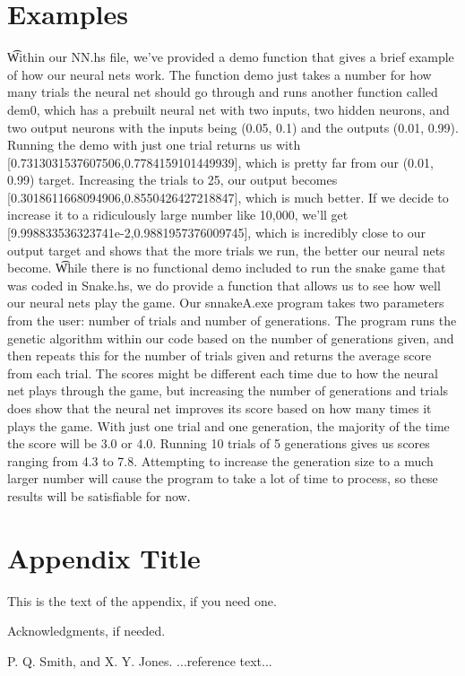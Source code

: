 \documentclass{sigplanconf}
\begin{document}
\section{Examples}
\t Within our NN.hs file, we've provided a demo function that gives a brief example of how our neural nets work. The function demo just takes a number for how many trials the neural net should go through and runs another function called dem0, which has a prebuilt neural net with two inputs, two hidden neurons, and two output neurons with the inputs being (0.05, 0.1) and the outputs (0.01, 0.99). Running the demo with just one trial returns us with [0.7313031537607506,0.7784159101449939], which is pretty far from our (0.01, 0.99) target. Increasing the trials to 25, our output becomes [0.3018611668094906,0.8550426427218847], which is much better. If we decide to increase it to a ridiculously large number like 10,000, we'll get [9.998833536323741e-2,0.9881957376009745], which is incredibly close to our output target and shows that the more trials we run, the better our neural nets become.
\t While there is no functional demo included to run the snake game that was coded in Snake.hs, we do provide a function that allows us to see how well our neural nets play the game. Our snnakeA.exe program takes two parameters from the user: number of trials and number of generations. The program runs the genetic algorithm within our code based on the number of generations given, and then repeats this for the number of trials given and returns the average score from each trial. The scores might be different each time due to how the neural net plays through the game, but increasing the number of generations and trials does show that the neural net improves its score based on how many times it plays the game. With just one trial and one generation, the majority of the time the score will be 3.0 or 4.0. Running 10 trials of 5 generations gives us scores ranging from 4.3 to 7.8. Attempting to increase the generation size to a much larger number will cause the program to take a lot of time to process, so these results will be satisfiable for now.

\appendix
\section{Appendix Title}

This is the text of the appendix, if you need one.

\acks

Acknowledgments, if needed.





\begin{thebibliography}{}
\softraggedright

P. Q. Smith, and X. Y. Jones. ...reference text...

\end{thebibliography}
\end{document}
